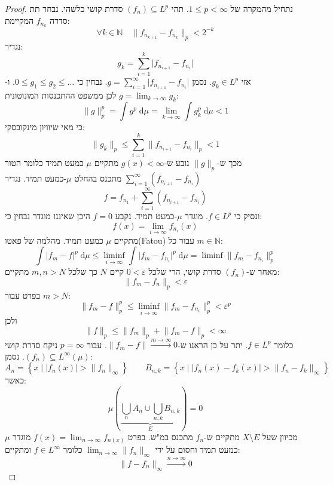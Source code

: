 \documentclass{tstextbook}
\begin{document}
\begin{proof}
נתחיל מהמקרה של \(1\leq p< \infty\). תהי \((f_{n})\subseteq L^{p}\) סדרת קושי כלשהי. נבחר תת סדרה \(f_{n_{k}}\) המקיימת:
$$\forall k \in \mathbb{N}\quad \lVert f_{n_{k+1}}-f_{n_{k}} \rVert _{p}<2^{-k}$$
נגדיר:
$$g_{k}= \sum_{i=1}^{k} \lvert f_{n_{i+1}}-f_{n_{i}} \rvert $$
אזי \(g_{k}\in L^{p}\). נסמן \(g=\sum_{i=1}^{\infty} \lvert f_{n_{i+1}}-f_{n_{i}} \rvert\). נבחין כי \(0\leq g_{1}\leq g_{2}\leq \dots\). ו-\(g=\lim_{ k \to \infty }g_{k}\) לכן ממשפט ההתכנסות המונוטונית:
$$\lVert g \rVert _{p}^{p}=\int g^{p} \;\mathrm{d} \mu = \lim_{ k \to \infty } \int g_{k}^{p} \;\mathrm{d} \mu < 1  $$
כי מאי שיוויון מינקובסקי:
$$\lVert g_{k} \rVert_{p}\leq \sum_{i=1}^{k}\lVert f_{n_{i+1}}-f_{n_{i}} \rVert_{p} < 1$$
מכך ש-\(\lVert g \rVert_{p}\) נובע ש-\(g(x)<\infty\) מתקיים \(\mu\) כמעט תמיד כלומר הטור \(\sum_{i=1}^{\infty} (f_{n_{i+1}}-f_{n_{i}})\) מתכנס בהחלט \(\mu\)-כמעט תמיד. נגדיר 
$$f=f_{n_{1}} + \sum_{i=1}^{\infty}  (f_{n_{i+1}}-f_{n_{i}})$$
ונסיק כי \(f \in L^{p}\). מוגדר \(\mu\)-כמעט תמיד. נקבע \(f=0\) היכן שאיננו מוגדר נבחין כי:
$$f(x)=\lim_{ i \to \infty } f_{n_{i}}(x)$$
מתקיים \(\mu\) כמעט תמיד. מהלמה של פאטו(Fatou) עבור כל \(m \in \mathbb{N}\):
$$\int \lvert f_{m}-f\rvert^{p}  \;\mathrm{d} \mu \leq \liminf_{ i \to \infty } \int \lvert f_{m}-f_{n_{i}} \rvert ^{p} \;\mathrm{d} \mu = \liminf  \lVert f_{m}-f_{n_{i}} \rVert _{p}^{p}$$
מאחר ש-\((f_{n})\) סדרת קושי, הרי שלכל \(0<\varepsilon\) קיים \(N\) כך שלכל \(m,n > N\) מתקיים:
$$\lVert f_{m}-f_{n} \rVert _{p}<\varepsilon$$
בפרט עבור \(m> N\):
$$\lVert f_{m}-f \rVert _{p}^{p}\leq \liminf_{i\to \infty} \lVert f_{m}-f_{n_{i}} \rVert _{p}^{p}<\varepsilon^{p} $$
ולכן
$$\lVert f \rVert _{p}\leq \lVert f_{m} \rVert _{p}+\lVert f_{m}-f \rVert_{p}< \infty$$
כלומר \(f \in L^{p}\). יתר על כן הראנו ש-\(\lVert f_{m}-f \rVert\xrightarrow{m\to \infty} 0\).
עבור \(p=\infty\) ניקח סדרת קושי \((f_{n})\subseteq L^{\infty}\left( \mu \right)\). נסמן:
$$A_{n}=\left\{  x\mid \lvert f_{n}(x) \rvert >\lVert f_{n} \rVert _{\infty}  \right\}\qquad B_{n,k}=\left\{  x \mid \lvert f_{n}(x)-f_{k}(x) \rvert > \lVert f_{n}-f_{k} \rVert _{\infty}  \right\}$$
כאשר:
$$\mu\left( \underbrace{ \bigcup_{n}A_{n}\cup \bigcup_{n,k}B_{n,k}  }_{ E }\right)=0$$
מכיוון שעל  \(X \setminus E\) מתקיים ש-\(f_{n}\) מתכנס במ"ש.
בפרט \(f(x)=\lim_{ n \to \infty }f_{n(x)}\) מוגדר \(\mu\) כמעט תמיד וחסום על ידי \(\lim_{ n \to \infty }\lVert f_{n} \rVert_{\infty}\) כלומר \(f \in L^{\infty}\) ומתקיים:
$$\lVert f-f_{n} \rVert _{\infty}\xrightarrow{n\to \infty} 0$$

\end{proof}
\end{document}

